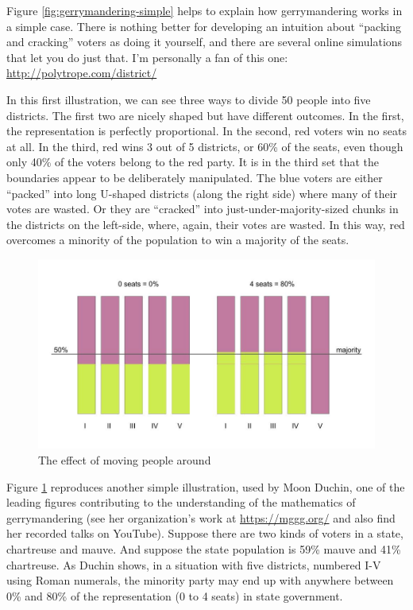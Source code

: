 \documentclass[
  openany]{book}
\begin{document}
Figure \ref{fig:gerrymandering-simple} helps to explain how gerrymandering works in a simple case. There is nothing better for developing an intuition about ``packing and cracking'' voters as doing it yourself, and there are several online simulations that let you do just that. I'm personally a fan of this one: \url{http://polytrope.com/district/}

In this first illustration, we can see three ways to divide 50 people into five districts. The first two are nicely shaped but have different outcomes. In the first, the representation is perfectly proportional. In the second, red voters win no seats at all. In the third, red wins 3 out of 5 districts, or 60\% of the seats, even though only 40\% of the voters belong to the red party. It is in the third set that the boundaries appear to be deliberately manipulated. The blue voters are either ``packed'' into long U-shaped districts (along the right side) where many of their votes are wasted. Or they are ``cracked'' into just-under-majority-sized chunks in the districts on the left-side, where, again, their votes are wasted. In this way, red overcomes a minority of the population to win a majority of the seats.

\begin{figure}

{\centering \includegraphics[width=0.9\linewidth]{images/gerrymandering2}

}

\caption{The effect of moving people around}\label{fig:gerrymandering-simple2}
\end{figure}

Figure \ref{fig:gerrymandering-simple2} reproduces another simple illustration, used by Moon Duchin, one of the leading figures contributing to the understanding of the mathematics of gerrymandering (see her organization's work at \url{https://mggg.org/} and also find her recorded talks on YouTube). Suppose there are two kinds of voters in a state, chartreuse and mauve. And suppose the state population is 59\% mauve and 41\% chartreuse. As Duchin shows, in a situation with five districts, numbered I-V using Roman numerals, the minority party may end up with anywhere between 0\% and 80\% of the representation (0 to 4 seats) in state government.
\end{document}
